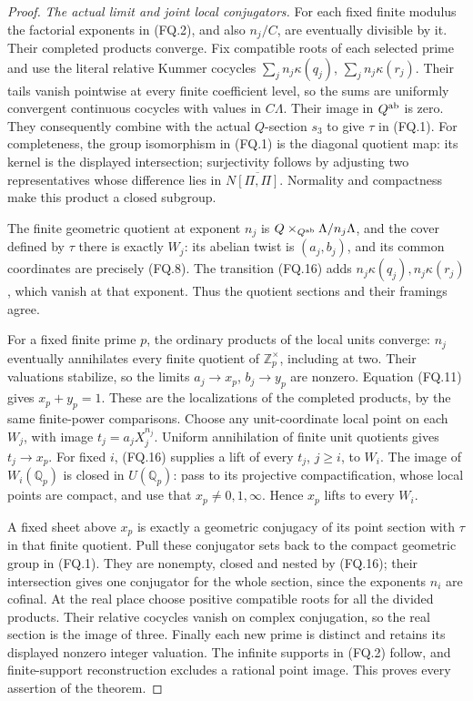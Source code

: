 \begin{proof}
\emph{The actual limit and joint local conjugators.}
For each fixed finite modulus the factorial
exponents in (FQ.2), and also \(n_j/C\),
are eventually divisible by it. Their completed
products converge. Fix compatible roots of
each selected prime and use the literal relative
Kummer cocycles
\(\sum_j n_j\kappa(q_j)\),
\(\sum_j n_j\kappa(r_j)\).
Their tails vanish pointwise at every finite
coefficient level, so the sums are uniformly
convergent continuous cocycles with values in
\(C\Lambda\). Their image in \(Q^{\rm ab}\)
is zero. They consequently combine with the
actual \(Q\)-section \(s_3\) to give \(\tau\)
in (FQ.1).
For completeness, the group isomorphism in
(FQ.1) is the diagonal quotient map: its kernel
is the displayed intersection; surjectivity
follows by adjusting two representatives whose
difference lies in
\(N\overline{[\Pi,\Pi]}\). Normality and
compactness make this product a closed subgroup.

The finite geometric quotient at exponent
\(n_j\) is
\(Q\times_{Q^{\rm ab}}\Lambda/n_j\Lambda\),
and the cover defined by \(\tau\) there is
exactly \(W_j\): its abelian twist is
\((a_j,b_j)\), and its common coordinates are
precisely (FQ.8). The transition (FQ.16)
adds \(n_j\kappa(q_j),n_j\kappa(r_j)\),
which vanish at that exponent. Thus the
quotient sections and their framings agree.

For a fixed finite prime \(p\), the ordinary
products of the local units converge: \(n_j\)
eventually annihilates every finite quotient
of \(\mathbb Z_p^\times\), including at two.
Their valuations stabilize, so the limits
\(a_j\to x_p\), \(b_j\to y_p\) are nonzero.
Equation (FQ.11) gives \(x_p+y_p=1\).
These are the localizations of the completed
products, by the same finite-power comparisons.
Choose any unit-coordinate local point on
each \(W_j\), with image \(t_j=a_jX_j^{n_j}\).
Uniform annihilation of finite unit quotients
gives \(t_j\to x_p\).
For fixed \(i\), (FQ.16) supplies a lift of
every \(t_j\), \(j\ge i\), to \(W_i\).
The image of \(W_i(\mathbb Q_p)\) is closed
in \(U(\mathbb Q_p)\): pass to its projective
compactification, whose local points are
compact, and use that \(x_p\ne0,1,\infty\).
Hence \(x_p\) lifts to every \(W_i\).

A fixed sheet above \(x_p\) is exactly a
geometric conjugacy of its point section with
\(\tau\) in that finite quotient. Pull these
conjugator sets back to the compact geometric
group in (FQ.1). They are nonempty, closed
and nested by (FQ.16); their intersection
gives one conjugator for the whole section,
since the exponents \(n_i\) are cofinal.
At the real place choose positive compatible
roots for all the divided products. Their
relative cocycles vanish on complex conjugation,
so the real section is the image of three.
Finally each new prime is distinct and retains
its displayed nonzero integer valuation.
The infinite supports in (FQ.2) follow, and
finite-support reconstruction excludes a
rational point image. This proves every
assertion of the theorem.
\end{proof}

